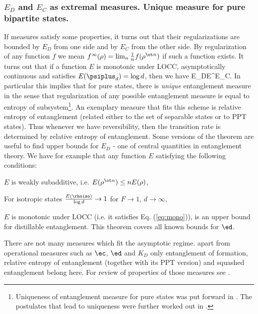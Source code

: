 \documentclass[twocolumn,aps,rmp]{revtex4}
\begin{document}
\subsubsection{$E_D$ and $E_C$ as extremal measures. Unique measure
for pure bipartite states.}
\label{subsubsec:extremal} If measures satisfy some properties, it
turns out that their regularizations are bounded by $E_D$ from one
side and by $E_C$ from the other side. By regularization of any
function $f$ we mean $f^{\infty}(\rho)=\lim_n {1\over n} f(\rho^{\ot
n})$ if such a function exists. It turns out that if a function $E$
is monotonic under LOCC, asymptotically continuous and satisfies
$E(\psiplus_d)=\log d$, then we have
\be
E_D\leq  E^\infty  \leq E_C.
\ee
In particular this implies that for pure states, there is {\it unique}
entanglement measure in the sense that regularization of any
possible entanglement measure is equal to entropy of
subsystem\footnote{Uniqueness of entanglement measure for pure states
was put forward in \cite{popescu-rohrlich}. The postulates that
lead to uniqueness were further worked out in \cite{Vidal-mon2000,limits,DonaldHR2001}.}. An
exemplary measure that fits this scheme is relative entropy of
entanglement (related either to the set of separable states or to PPT
states). Thus whenever we have reversibility, then the transition
rate is determined by relative entropy of entanglement. Some
versions of the theorem are useful to find upper bounds for $E_D$ -
one of central quantities in entanglement theory. We have for
example that any function $E$ satisfying the following conditions:
\bee
\item $E$ is weakly subadditive, i.e. $E(\rho^{\ot n})\leq nE(\rho)$,
\item For isotropic states ${E(\rhoiso)\over \log d} \to 1$
for $F\to 1$, $d\to \infty$,
\item $E$ is monotonic under LOCC (i.e. it satisfies Eq. (\ref{eq:mono})),
\eee
is an upper bound for distillable entanglement. This theorem
covers all known bounds for $\ed$.


There are not many measures which fit the asymptotic regime. apart
from operational measures such as $\ec$, $\ed$ and $K_D$ only
entanglement of formation, relative entropy of entanglement
(together with its PPT version) and squashed entanglement belong
here. For review of properties of those measures see
\cite{Christandl-PhD}.
\end{document}
